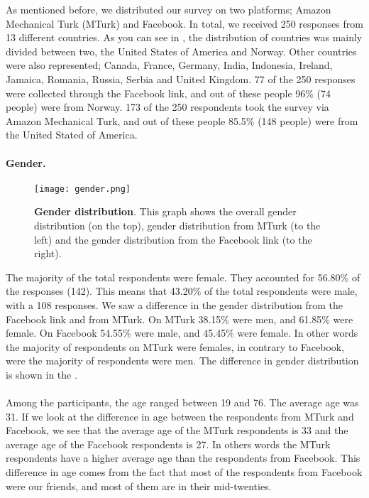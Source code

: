 As mentioned before, we distributed our survey on two platforms; Amazon Mechanical Turk (MTurk) and Facebook. In total, we received 250 responses from 13 different countries. As you can see in , the distribution of countries was mainly divided between two, the United States of America and Norway. Other countries were also represented; Canada, France, Germany, India, Indonesia, Ireland, Jamaica, Romania, Russia, Serbia and United Kingdom. 77 of the 250 responses were collected through the Facebook link, and out of these people 96\% (74 people) were from Norway. 173 of the 250 respondents took the survey via Amazon Mechanical Turk, and out of these people 85.5\% (148 people) were from the United Stated of America. 

\paragraph{Gender.}

\begin{figure}[h!]
\centering
\texttt{[image: gender.png]}
\caption[Gender distribution]{\textbf{Gender distribution}. This graph shows the overall gender distribution (on the top), gender distribution from MTurk (to the left) and the gender distribution from the Facebook link (to the right).} 
\label{fig:gender}
\end{figure}

The majority of the total respondents were female. They accounted for 56.80\% of the responses (142). This means that 43.20\% of the total respondents were male, with a 108 responses. We saw a difference in the gender distribution from the Facebook link and from MTurk. On MTurk 38.15\% were men, and 61.85\% were female. On Facebook 54.55\% were male, and 45.45\% were female. In other words the majority of respondents on MTurk were females, in contrary to Facebook, were the majority of respondents were men. The difference in gender distribution is shown in the .

\paragraph{}
Among the participants, the age ranged between 19 and 76. The average age was 31. If we look at the difference in age between the respondents from MTurk and Facebook, we see that the average age of the MTurk respondents is 33 and the average age of the Facebook respondents is 27. In others words the MTurk respondents have a higher average age than the respondents from Facebook. This difference in age comes from the fact that most of the respondents from Facebook were our friends, and most of them are in their mid-twenties. 

